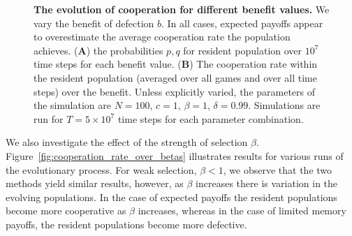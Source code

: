 \documentclass[11pt]{article}
\theoremstyle{plainCl1}
\theoremstyle{plainCl2}
\begin{document}
\begin{figure}[!htbp]
\begin{subfigure}{.5\textwidth}
  \end{subfigure}
  \caption{{\bf The evolution of cooperation for different benefit values.} 
  We vary the benefit of defection $b$. In all cases, expected payoffs appear to
  overestimate the average cooperation rate the population achieves. ({\bf A})
  the probabilities \(p, q\) for resident population over \(10^7\) time steps
  for each benefit value. ({\bf B}) The cooperation rate within the resident population
  (averaged over all games and over all time steps) over the benefit.
  Unless
  explicitly varied, the parameters of the simulation are $N\!=\!100$,
  $c\!=\!1$, $\beta\!=\!1$, $\delta\!=\!0.99$. Simulations are run
  for $T\!=\!5\times 10^7$ time steps for each parameter
  combination.}\label{fig:cooperation_rate_over_benefit}
\end{figure}

We also investigate the effect of the strength of selection $\beta$.
Figure~\ref{fig:cooperation_rate_over_betas} illustrates results for various
runs of the evolutionary process. For weak selection, \(\beta < 1\), we observe
that the two methods yield similar results, however, as \(\beta\) increases
there is variation in the evolving populations. In the case of expected payoffs
the resident populations become more cooperative as \(\beta\)
increases, whereas in the case of limited memory payoffs, the resident
populations become more defective.
\end{document}
